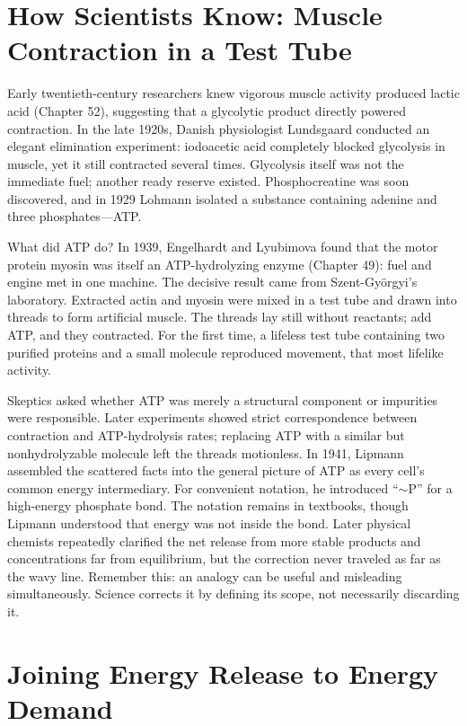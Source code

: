\section{How Scientists Know: Muscle Contraction in a Test Tube}

\begin{zhengju}
Early twentieth-century researchers knew vigorous muscle activity produced lactic acid (Chapter 52), suggesting that a glycolytic product directly powered contraction. In the late 1920s, Danish physiologist Lundsgaard conducted an elegant elimination experiment: iodoacetic acid completely blocked glycolysis in muscle, yet it still contracted several times. Glycolysis itself was not the immediate fuel; another ready reserve existed. Phosphocreatine was soon discovered, and in 1929 Lohmann isolated a substance containing adenine and three phosphates---ATP.

What did ATP do? In 1939, Engelhardt and Lyubimova found that the motor protein myosin was itself an ATP-hydrolyzing enzyme (Chapter 49): fuel and engine met in one machine. The decisive result came from Szent-Györgyi's laboratory. Extracted actin and myosin were mixed in a test tube and drawn into threads to form artificial muscle. The threads lay still without reactants; add ATP, and they contracted. For the first time, a lifeless test tube containing two purified proteins and a small molecule reproduced movement, that most lifelike activity.

Skeptics asked whether ATP was merely a structural component or impurities were responsible. Later experiments showed strict correspondence between contraction and ATP-hydrolysis rates; replacing ATP with a similar but nonhydrolyzable molecule left the threads motionless. In 1941, Lipmann assembled the scattered facts into the general picture of ATP as every cell's common energy intermediary. For convenient notation, he introduced ``$\sim$P'' for a high-energy phosphate bond. The notation remains in textbooks, though Lipmann understood that energy was not inside the bond. Later physical chemists repeatedly clarified the net release from more stable products and concentrations far from equilibrium, but the correction never traveled as far as the wavy line. Remember this: an analogy can be useful and misleading simultaneously. Science corrects it by defining its scope, not necessarily discarding it.
\end{zhengju}
\section{Joining Energy Release to Energy Demand}

